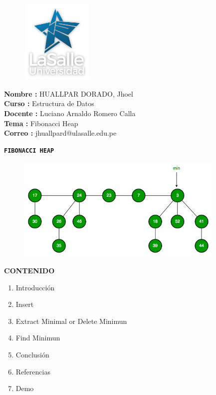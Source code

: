 \documentclass[11pt]{beamer}
\begin{document}
\begin{frame}

\begin{figure}[center]
  \includegraphics[width=3.5cm, height=4cm]{Img/ULA.png}
\end{figure}


{\bf \large Nombre  :} \large HUALLPAR DORADO, Jhoel \\
{\bf \large Curso   :} \large Estructura de Datos \\
{\bf \large Docente :} \large Luciano Arnaldo Romero Calla \\
{\bf \large Tema    :} \Large Fibonacci Heap\\
{\bf \large Correo  :} \large jhuallpard@ulasalle.edu.pe\\

\titlepage
\end{frame}

\begin{frame} {\bf \large {}}
\tableofcontents
{\center \bf \Huge \color{purple} \texttt{FIBONACCI HEAP} \\}

\begin{figure}[center]
  \includegraphics[width=10cm, height=5cm]{Img/FH.png}
\end{figure}

\end{frame}

\begin{frame} {\bf \large {}}
\tableofcontents
{\center \bf \Large \color{red} CONTENIDO \\}

\begin{enumerate}
\item Introducci\'on
\item Insert
\item Extract Minimal or Delete Minimun
\item Find Minimun
\item Conclusi\'on
\item Referencias
\item Demo
\end{enumerate}

\end{frame}
\end{document}
